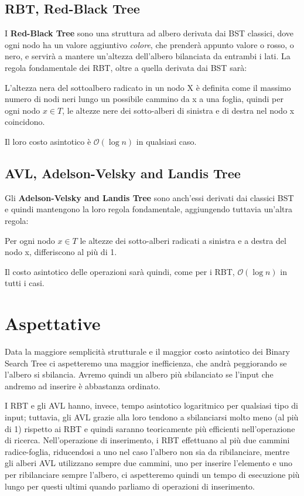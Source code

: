 \documentclass[a4paper,titlepage]{article}
\begin{document}
\subsection{RBT, Red-Black Tree}
I \textbf{Red-Black Tree} sono una struttura ad albero derivata dai BST classici, dove ogni nodo ha un valore aggiuntivo \textit{colore}, che prenderà appunto valore o rosso, o nero, e servirà a mantere un’altezza dell’albero bilanciata da entrambi i lati.
La regola fondamentale dei RBT, oltre a quella derivata dai BST sarà:

\begin{displayquote}
L'altezza nera del sottoalbero radicato in un nodo X è definita come il massimo numero di nodi neri lungo un possibile cammino da x a una foglia, quindi per ogni nodo \(x \in T\), le altezze nere dei sotto-alberi di sinistra e di destra nel nodo x coincidono.
\end{displayquote}

Il loro costo asintotico è  \(\mathcal{O}(\log{}n)\) in qualsiasi caso.

\subsection{AVL, Adelson-Velsky and Landis Tree}

Gli \textbf{Adelson-Velsky and Landis Tree} sono anch’essi derivati dai classici BST e quindi mantengono la loro regola fondamentale, aggiungendo tuttavia un’altra regola:

\begin{displayquote}
Per ogni nodo  \(x \in T\) le altezze dei sotto-alberi radicati a sinistra e a destra del nodo x, differiscono al più di 1.
\end{displayquote}

Il costo asintotico delle operazioni sarà quindi, come per i RBT, \(\mathcal{O}(\log{}n)\) in tutti i casi. 
\newpage

\section{Aspettative}
Data la maggiore semplicità strutturale e il maggior costo asintotico dei Binary Search Tree ci aspetteremo una maggior inefficienza, che andrà peggiorando se l’albero si sbilancia.
Avremo quindi un albero più sbilanciato se l’input che andremo ad inserire è abbastanza ordinato.

I RBT e gli AVL hanno, invece, tempo asintotico logaritmico per qualsiasi tipo di input; tuttavia, gli AVL grazie alla loro  tendono a sbilanciarsi molto meno (al più di 1) rispetto ai RBT e quindi saranno teoricamente più efficienti nell’operazione di ricerca.
Nell’operazione di inserimento, i RBT effettuano al più due cammini radice-foglia, riducendosi a uno nel caso l’albero non sia da ribilanciare, mentre gli alberi AVL utilizzano sempre due cammini, uno per inserire l’elemento e uno per ribilanciare sempre l’albero, ci aspetteremo quindi un tempo di esecuzione più lungo per questi ultimi quando parliamo di operazioni di inserimento. 
\end{document}
